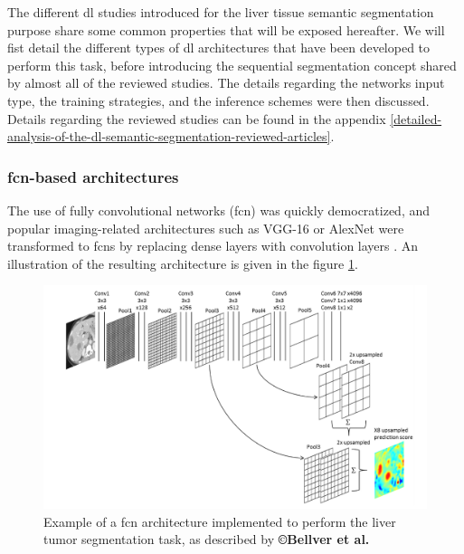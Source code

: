 The different \ac{dl} studies introduced for the liver tissue semantic
segmentation purpose share some common properties that will be exposed
hereafter. We will fist detail the different types of \ac{dl} architectures that have been developed to perform this task, before introducing the sequential segmentation concept shared by almost all of the reviewed studies. The details regarding the networks input type, the training strategies, and the inference schemes were then discussed.
Details regarding the reviewed studies can be found in the appendix \ref{detailed-analysis-of-the-dl-semantic-segmentation-reviewed-articles}.

\subsubsection{\ac{fcn}-based architectures}

The use of fully convolutional networks (\ac{fcn}) was quickly democratized,
and popular imaging-related architectures such as VGG-16 or AlexNet
were transformed to \ac{fcn}s by replacing dense layers with convolution
layers \cite{Ben-Cohen, Bellver2017}. An illustration of the resulting architecture is given in the figure \ref{Bellver_FCN}. 

\begin{figure}[th!]
	\centering
	\includegraphics[width=0.7\linewidth]{images/image3}
	\caption{Example of a \ac{fcn} architecture implemented to perform the liver tumor segmentation task, as described by \textbf{©Bellver et al. \cite{Bellver2017}}}
	\label{Bellver_FCN}
\end{figure}


